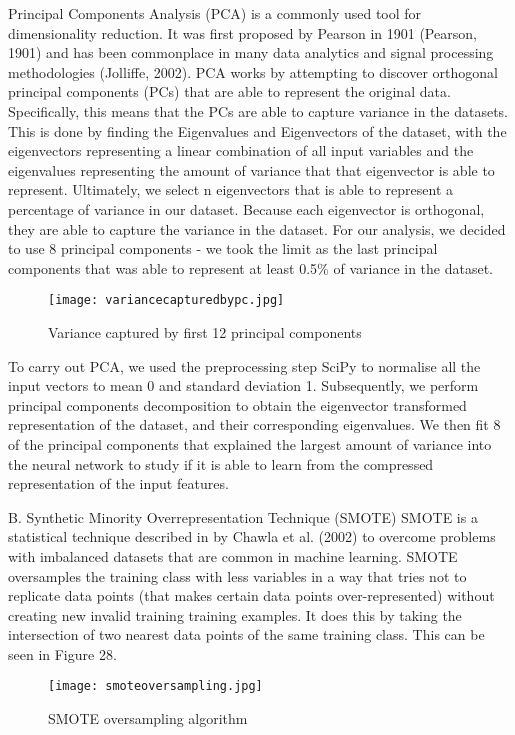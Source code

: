 \documentclass{article}
\begin{document}
Principal Components Analysis (PCA) is a commonly used tool for dimensionality reduction. It was first proposed by Pearson in 1901 (Pearson, 1901) and has been commonplace in many data analytics and signal processing methodologies (Jolliffe, 2002). PCA works by attempting to discover orthogonal principal components (PCs) that are able to represent the original data. Specifically, this means that the PCs are able to capture variance in the datasets. This is done by finding the Eigenvalues and Eigenvectors of the dataset, with the eigenvectors representing a linear combination of all input variables and the eigenvalues representing the amount of variance that that eigenvector is able to represent. Ultimately, we select n eigenvectors that is able to represent a percentage of variance in our dataset. Because each eigenvector is orthogonal, they are able to capture the variance in the dataset. For our analysis, we decided to use 8 principal components - we took the limit as the last principal components that was able to represent at least 0.5\% of variance in the dataset.
 
\begin{figure}[H]
\texttt{[image: variancecapturedbypc.jpg]}
\caption{Variance captured by first 12 principal components}
\centering
\end{figure}

To carry out PCA, we used the preprocessing step SciPy to normalise all the input vectors to mean 0 and standard deviation 1. Subsequently, we perform principal components decomposition to obtain the eigenvector transformed representation of the dataset, and their corresponding eigenvalues. We then fit 8 of the principal components that explained the largest amount of variance into the neural network to study if it is able to learn from the compressed representation of the input features. 

B. Synthetic Minority Overrepresentation Technique (SMOTE)
SMOTE is a statistical technique described in by Chawla et al. (2002) to overcome problems with imbalanced datasets that are common in machine learning. SMOTE oversamples the training class with less variables in a way that tries not to replicate data points (that makes certain data points over-represented) without creating new invalid training training examples. It does this by taking the intersection of two nearest data points of the same training class. This can be seen in Figure 28. 

\begin{figure}[H]
\texttt{[image: smoteoversampling.jpg]}
\caption{SMOTE oversampling algorithm}
\centering
\end{figure}
\end{document}
